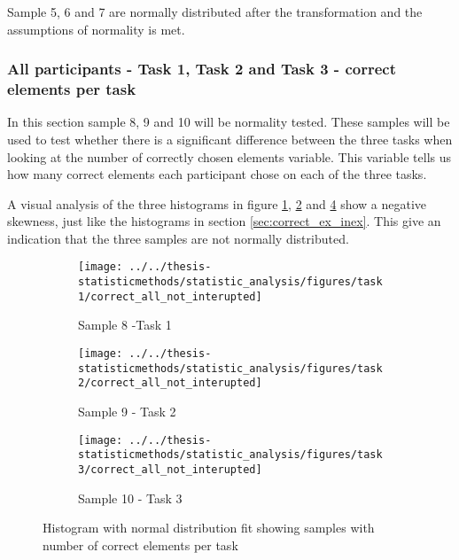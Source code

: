 \vspace{0.3cm}

 Sample 5, 6 and 7 are normally distributed after the transformation and the assumptions of normality is met. 
 
 \subsubsection[Sample 8, 9 and 10]{All participants - Task 1, Task 2 and Task 3 - correct elements per task}\label{sec:task123_correct_normaltest}
 In this section sample 8, 9 and 10 will be normality tested. These samples will be used to test whether there is a significant difference between the three tasks when looking at the number of correctly chosen elements variable. This variable tells us how many correct elements each participant chose on each of the three tasks. 

A visual analysis of the three histograms in figure \ref{fig:correctallnotinterupted_task1}, \ref{fig:correctallnotinterupted_task2} and \ref{fig:correctallnotinterupted_task3} show a negative skewness, just like the histograms in section \ref{sec:correct_ex_inex}. This give an indication that the three samples are not normally distributed. 
 
 \begin{figure}[H]
 	\centering
	 \begin{subfigure}[b]{0.3\textwidth}
	 	\centering
	 	\texttt{[image: ../../thesis-statisticmethods/statistic\_analysis/figures/task1/correct\_all\_not\_interupted]}
	 	\caption{Sample 8 -Task 1}
	 	\label{fig:correctallnotinterupted_task1}
	 \end{subfigure}
	\begin{subfigure}[b]{0.3\textwidth}
		\centering
		\texttt{[image: ../../thesis-statisticmethods/statistic\_analysis/figures/task2/correct\_all\_not\_interupted]}
		\caption{Sample 9 - Task 2}
		\label{fig:correctallnotinterupted_task2}
	\end{subfigure}
	 \begin{subfigure}[b]{0.3\textwidth}
	 	\centering
	 	\texttt{[image: ../../thesis-statisticmethods/statistic\_analysis/figures/task3/correct\_all\_not\_interupted]}
	 	\caption{Sample 10 - Task 3}
	 	\label{fig:correctallnotinterupted_task3}
	 \end{subfigure}
 \caption{Histogram with normal distribution fit showing samples with number of correct elements per task}
 \end{figure}
 
